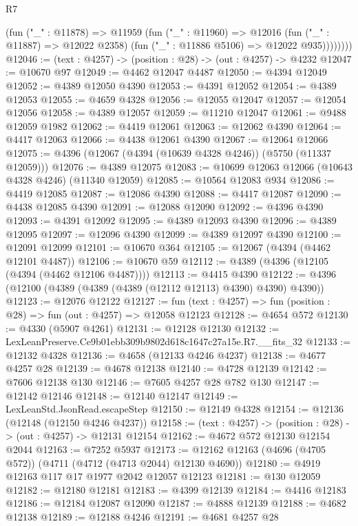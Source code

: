 \begin{lexlean}{R7}
\begin{coremodule}
              (fun ("_" : @11878) =>
              @11959
                (fun ("_" : @11960) =>
                @12016
                  (fun ("_" : @11887) => @12022 @2358)
                  (fun ("_" : @11886 @5106) => @12022 @935))))))))
@12046 := (text : @4257) -> (position : @28) -> (out : @4257) -> @4232
@12047 := @10670 @97
@12049 := @4462 @12047 @4487
@12050 := @4394 @12049
@12052 := @4389 @12050 @4390
@12053 := @4391 @12052
@12054 := @4389 @12053
@12055 := @4659 @4328
@12056 := @12055 @12047
@12057 := @12054 @12056
@12058 := @4389 @12057
@12059 := @11210 @12047
@12061 := @9488 @12059 @1982
@12062 := @4419 @12061
@12063 := @12062 @4390
@12064 := @4417 @12063
@12066 := @4438 @12061 @4390
@12067 := @12064 @12066
@12075 := @4396 (@12067 (@4394 (@10639 @4328 @4246)) (@5750 (@11337 @12059)))
@12076 := @4389 @12075
@12083 := @10699 @12063 @12066 (@10643 @4328 @4246) (@11340 @12059)
@12085 := @10564 @12083 @934
@12086 := @4419 @12085
@12087 := @12086 @4390
@12088 := @4417 @12087
@12090 := @4438 @12085 @4390
@12091 := @12088 @12090
@12092 := @4396 @4390
@12093 := @4391 @12092
@12095 := @4389 @12093 @4390
@12096 := @4389 @12095
@12097 := @12096 @4390
@12099 := @4389 @12097 @4390
@12100 := @12091 @12099
@12101 := @10670 @364
@12105 := @12067 (@4394 (@4462 @12101 @4487))
@12106 := @10670 @59
@12112 := @4389 (@4396 (@12105 (@4394 (@4462 @12106 @4487))))
@12113 := @4415 @4390
@12122 := @4396 (@12100 (@4389 (@4389 (@4389 (@12112 @12113) @4390) @4390) @4390))
@12123 := @12076 @12122
@12127 := fun (text : @4257) => fun (position : @28) => fun (out : @4257) => @12058 @12123
@12128 := @4654 @572
@12130 := @4330 (@5907 @4261)
@12131 := @12128 @12130
@12132 := LexLeanPreserve.Ce9b01ebb309b9802d618c1647c27a15e.R7.__fits_32
@12133 := @12132 @4328
@12136 := @4658 (@12133 @4246 @4237)
@12138 := @4677 @4257 @28
@12139 := @4678 @12138
@12140 := @4728 @12139
@12142 := @7606 @12138 @130
@12146 := @7605 @4257 @28 @782 @130
@12147 := @12142 @12146
@12148 := @12140 @12147
@12149 := LexLeanStd.JsonRead.escapeStep
@12150 := @12149 @4328
@12154 := @12136 (@12148 (@12150 @4246 @4237))
@12158 := (text : @4257) -> (position : @28) -> (out : @4257) -> @12131 @12154
@12162 := @4672 @572 @12130 @12154 @2044
@12163 := @7252 @5937
@12173 := @12162 @12163 (@4696 (@4705 @572)) (@4711 (@4712 (@4713 @2044) @12130 @4690))
@12180 := @4919 @12163 @117 @17 @1977 @2042 @12057 @12123
@12181 := @130 @12059
@12182 := @12180 @12181
@12183 := @4399 @12139
@12184 := @4416 @12183
@12186 := @12184 @12087 @12090
@12187 := @4888 @12139
@12188 := @4682 @12138
@12189 := @12188 @4246
@12191 := @4681 @4257 @28

\end{coremodule}
\end{lexlean}
